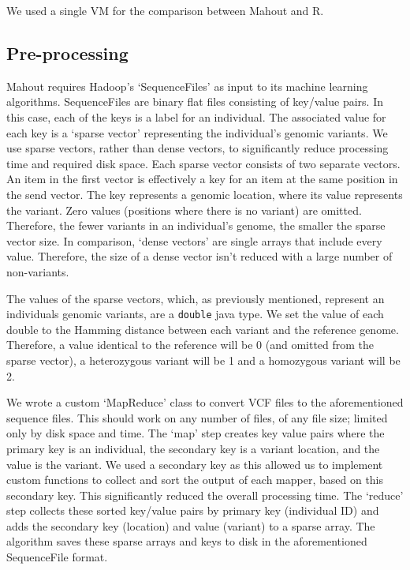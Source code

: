 \documentclass{bioinfo}
\begin{document}
\begin{methods}
We used a single VM for the comparison between Mahout and R.

\subsection*{Pre-processing}
\label{Sec:preprocessing}
Mahout requires Hadoop's `SequenceFiles' as input to its machine learning algorithms. SequenceFiles are binary flat files consisting of key/value pairs. In this case, each of the keys is a
label for an individual. The associated value for each key is a `sparse vector' representing the individual's genomic variants. We use sparse vectors, rather than
dense vectors, to significantly reduce processing time and required disk space. Each sparse vector consists of two separate vectors. An item in the first vector is
effectively a key for an item at the same position in the send vector. The key represents a genomic location, where its value represents the variant. Zero values (positions where there is no variant)
are omitted. Therefore, the fewer variants in an individual's genome, the smaller the sparse vector size. In comparison, `dense vectors' are single arrays that
include every value. Therefore, the size of a dense vector isn't reduced with a large number of non-variants.

The values of the sparse vectors, which, as previously mentioned, represent an individuals genomic variants, are a \texttt{double} java type.
We set the value of each double to the Hamming distance between each variant and the reference genome. Therefore, a value identical to the reference will be 0 (and omitted from the sparse vector),
a heterozygous variant will be 1 and a homozygous variant will be 2.

We wrote a custom `MapReduce' class to convert VCF files to the aforementioned sequence files. This should work on any number of files,
of any file size; limited only by disk space and time. The `map' step creates key value pairs where the primary key is an individual, the secondary key is a variant location, and the value is the variant.
We used a secondary key as this allowed us to implement custom functions to collect and sort the output of each mapper, based on this secondary key. This significantly reduced
the overall processing time. The `reduce' step collects these sorted key/value pairs by primary key (individual ID) and adds the secondary key (location) and value (variant) to a sparse array. The algorithm
saves these sparse arrays and keys to disk in the aforementioned SequenceFile format.   



\end{methods}
\end{document}
